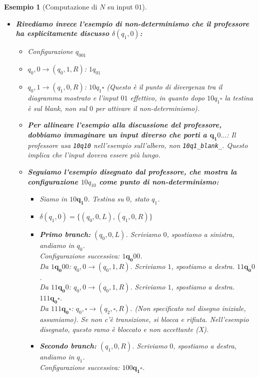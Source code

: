 \documentclass[a4paper]{article}
\newtheorem{example}{Esempio}
\newcommand{\blankS}{\ensuremath{\square}}
\begin{document}
\begin{example}[Computazione di $N$ su input $01$]
\begin{enumerate}
\begin{itemize}
        \item \textbf{Rivediamo invece l'esempio di non-determinismo che il professore ha esplicitamente discusso $\delta(q_1,0)$:}
        \begin{itemize}
            \item Configurazione $q_001$
            \item $q_0,0 \to (q_0,1,R)$: $1q_01$
            \item $q_0,1 \to (q_1,0,R)$: $10q_1\blankS$ (Questo è il punto di divergenza tra il diagramma mostrato e l'input $01$ effettivo, in quanto dopo $10q_1\blankS$ la testina è sul blank, non sul $0$ per attivare il non-determinismo).
            \item \textbf{Per allineare l'esempio alla discussione del professore, dobbiamo immaginare un input diverso che porti a $\mathbf{q_1}0...$}: Il professore usa \texttt{10q10} nell'esempio sull'albero, non \texttt{10q1\_blank\_}. Questo implica che l'input doveva essere più lungo.
            \item \textbf{Seguiamo l'esempio disegnato dal professore, che mostra la configurazione $10q_10$ come punto di non-determinismo:}
            \begin{itemize}
                \item Siamo in $10\mathbf{q_1}0$. Testina su $0$, stato $q_1$.
                \item $\delta(q_1, 0) = \{ (q_0, 0, L), (q_1, 0, R) \}$
                \item \textbf{Primo branch:} $(q_0, 0, L)$. Scriviamo $0$, spostiamo a sinistra, andiamo in $q_0$.\\
                Configurazione successiva: $1\mathbf{q_0}00$.\\
                Da $1\mathbf{q_0}00$: $q_0,0 \to (q_0,1,R)$. Scriviamo $1$, spostiamo a destra. $11\mathbf{q_0}0$.\\
                Da $11\mathbf{q_0}0$: $q_0,0 \to (q_0,1,R)$. Scriviamo $1$, spostiamo a destra. $111\mathbf{q_0}\blankS$.\\
                Da $111\mathbf{q_0}\blankS$: $q_0,\blankS \to (q_2,\blankS,R)$. (Non specificato nel disegno iniziale, assumiamo). Se non c'è transizione, si blocca e rifiuta. Nell'esempio disegnato, questo ramo è bloccato e non accettante (X).
                \item \textbf{Secondo branch:} $(q_1, 0, R)$. Scriviamo $0$, spostiamo a destra, andiamo in $q_1$.\\
                Configurazione successiva: $100\mathbf{q_1}\blankS$.\\

\end{itemize}
\end{itemize}
\end{itemize}
\end{enumerate}
\end{example}
\end{document}
